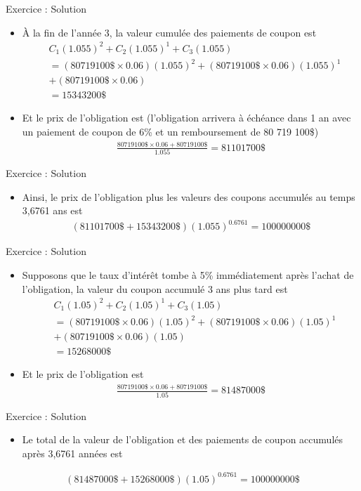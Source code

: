 \documentclass[10pt,a4paper]{beamer}
\begin{document}
\begin{frame}{Exercice : Solution}
\begin{itemize}[label=\bullet]
\item À la fin de l'année 3, la valeur cumulée des paiements de coupon est
\begin{align*}
&C_1 (1.055)^2+C_2 (1.055)^1+C_3 (1.055) \\
&= (80 719 100\$ \times 0.06)(1.055)^2+(80 719 100\$ \times 0.06)(1.055)^1\\
&+(80 719 100\$ \times 0.06) \\
&= 15 343 200 \$
\end{align*}
\item Et le prix de l'obligation est (l'obligation arrivera à échéance dans 1 an avec un paiement de coupon de 6\% et un remboursement de 80 719 100\$)
\begin{align*}
\frac{80 719 100\$ \times 0.06+80 719 100\$}{1.055}=81 101 700 \$
\end{align*}
\end{itemize}
\end{frame}


\begin{frame}{Exercice : Solution}
\begin{itemize}[label=\bullet]
\item Ainsi, le prix de l'obligation plus les valeurs des coupons accumulés au temps 3,6761 ans est
\begin{align*}
(81 101 700 \$+15 343 200 \$)(1.055)^{0.6761}=100 000 000\$
\end{align*}
\end{itemize}
\end{frame}

\begin{frame}{Exercice : Solution}
\begin{itemize}[label=\bullet]
\item Supposons que le taux d'intérêt tombe à 5\% immédiatement après l'achat de l'obligation, la valeur du coupon accumulé 3 ans plus tard est
\begin{align*}
&C_1 (1.05)^2+C_2 (1.05)^1+C_3 (1.05) \\
&= (80 719 100\$ \times 0.06)(1.05)^2+(80 719 100\$ \times 0.06)(1.05)^1\\
&+(80 719 100\$ \times 0.06)(1.05) \\
&= 15 268 000 \$
\end{align*}
\item Et le prix de l'obligation est
\begin{align*}
\frac{80 719 100\$ \times 0.06+80 719 100\$}{1.05}=81 487 000 \$
\end{align*}
\end{itemize}
\end{frame}

\begin{frame}{Exercice : Solution}
\begin{itemize}[label=\bullet]
\item Le total de la valeur de l'obligation et des paiements de coupon accumulés après 3,6761 années est
\end{itemize}
\begin{align*}
(81 487 000 \$+15 268 000 \$)(1.05)^{0.6761}=100 000 000\$
\end{align*}
\end{frame}
\end{document}
